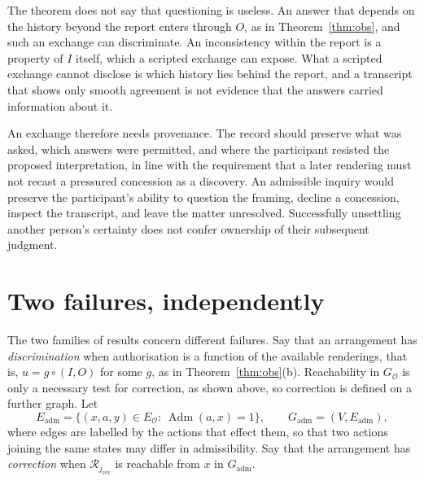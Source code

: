 \documentclass[11pt]{article}
\theoremstyle{definition}
\theoremstyle{remark}
\newcommand{\Adm}{\operatorname{Adm}}
\begin{document}
The theorem does not say that questioning is useless. An answer that depends on the history beyond the report enters through $O$, as in Theorem~\ref{thm:obs}, and such an exchange can discriminate. An inconsistency within the report is a property of $I$ itself, which a scripted exchange can expose. What a scripted exchange cannot disclose is which history lies behind the report, and a transcript that shows only smooth agreement is not evidence that the answers carried information about it.

An exchange therefore needs provenance. The record should preserve what was asked, which answers were permitted, and where the participant resisted the proposed interpretation, in line with the requirement that a later rendering must not recast a pressured concession as a discovery. An admissible inquiry would preserve the participant's ability to question the framing, decline a concession, inspect the transcript, and leave the matter unresolved. Successfully unsettling another person's certainty does not confer ownership of their subsequent judgment.

\section{Two failures, independently}

The two families of results concern different failures. Say that an arrangement has \emph{discrimination} when authorisation is a function of the available renderings, that is, $u=g\circ(I,O)$ for some $g$, as in Theorem~\ref{thm:obs}(b). Reachability in $G_{\mathcal O}$ is only a necessary test for correction, as shown above, so correction is defined on a further graph. Let
\[
E_{\mathrm{adm}}=\{(x,a,y)\in E_{\mathcal O}:\ \Adm(a,x)=1\},\qquad G_{\mathrm{adm}}=(V,E_{\mathrm{adm}}),
\]
where edges are labelled by the actions that effect them, so that two actions joining the same states may differ in admissibility. Say that the arrangement has \emph{correction} when $\mathcal R_{j_{\mathrm{rev}}}$ is reachable from $x$ in $G_{\mathrm{adm}}$.
\end{document}
